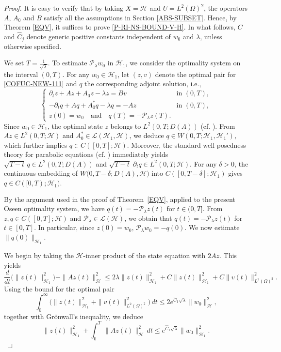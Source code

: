 \documentclass[a4paper]{article}
\numberwithin{equation}{section}
\begin{document}
\begin{proof}
It is easy to verify that by taking $X=\mathcal{H}$ and $U=L^2(\Omega)^2$, the operators $A$, $A_0$ and $B$ satisfy all the assumptions in Section \ref{ABS-SUBSET}. Hence, by Theorem \ref{EQV}, it suffices to prove \eqref{P-RI-NS-BOUND-V-H}. In what follows, $C$ and $\hat{C}_j$ denote generic positive constants independent of $w_0$ and $\lambda$, unless otherwise specified. 

We set $T=\frac{1}{\sqrt{\lambda}}$.
To estimate $\mathcal P_\lambda w_0$ in $\mathcal H_1$, we consider the optimality system on the interval $(0,T)$. For any $w_0\in \mathcal{H}_1$, let $(z,v)$ denote the optimal pair for \eqref{COFUC-NEW-111} and $q$ the corresponding adjoint solution, i.e.,
$$\begin{cases}
\partial_t z + Az + A_0 z -\lambda z= Bv& \text{in } (0,T),\\
-\partial_t q + A q + A_0^* q - \lambda q = -A z & \text{in } (0,T),\\
z(0)=w_0\quad \text{and}\quad q(T)=-\mathcal{P}_\lambda z(T).
\end{cases}$$ 
Since $w_0\in\mathcal H_1$, the optimal state $z$ belongs to $L^2(0,T;D(A))$ (cf. \cite{LM}). From $Az\in L^2(0,T;\mathcal{H})$ and $A_0^*\in \mathcal L(\mathcal H_1,\mathcal H)$, we deduce $q\in W(0,T;\mathcal{H}_1,\mathcal{H}_1')$, which further implies $q\in C([0,T];\mathcal{H})$. Moreover, the standard well-posedness theory for parabolic equations (cf. \cite[Chapter 1]{B2})  immediately yields $\sqrt{T-t}\,q\in L^2(0,T;D(A))$ and $\sqrt{T-t}\;\partial_t q\in L^2(0,T;\mathcal{H})$. For any $\delta>0$, the continuous embedding of $W\big(0,T-\delta;D(A),\mathcal{H}\big)$ into $ C([0,T-\delta];\mathcal{H}_1)$ gives $q\in C([0,T);\mathcal{H}_1)$.

By the argument used in the proof of Theorem~\ref{EQV}, applied to the present Oseen optimality system, we have $q(t)=-\mathcal P_\lambda z(t)$ for $ t\in(0,T]$. From $z,q\in C([0,T];\mathcal{H})$ and $\mathcal P_\lambda\in \mathcal L(\mathcal H)$, we obtain that $q(t)=-\mathcal P_\lambda z(t)$ for $ t\in [0,T]$. In particular, since $z(0)=w_0$,
$\mathcal P_\lambda w_0=-q(0)$. We now estimate $\|q(0)\|_{\mathcal H_1}$.

We begin by taking the $\mathcal H$-inner product of the state equation with $2 A z$. This yields
$$\frac{d}{dt}\bigl(\|z(t)\|_{\mathcal H_1}^2\bigr)+\| A z(t)\|_{\mathcal H}^2\le 2\lambda\|z(t)\|_{\mathcal H_1}^2+C\|z(t)\|_{\mathcal H_1}^2+C\|v(t)\|^2_{L^2(\Omega)^2}.$$
Using the bound for the optimal pair 
\begin{equation}\label{P-V-1-NS}
\int_0^\infty \bigl(\|z(t)\|_{\mathcal H_1}^2+\|v(t)\|_{L^2(\Omega)^2}^2\bigr)\,dt\le 2e^{\widetilde C_1\sqrt{\lambda}}\|w_0\|_{\mathcal H}^2,
\end{equation}
together with Gr\"onwall's inequality, we deduce
\begin{equation}\label{P-V-2-NS}
\|z(t)\|_{\mathcal H_1}^2+\int_0^T \,\| A z(t)\|_{\mathcal H}^2\,dt\le e^{\hat C_1\sqrt{\lambda}}\|w_0\|_{\mathcal H_1}^2.
\end{equation}


\end{proof}
\end{document}
